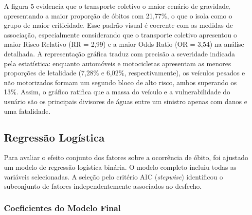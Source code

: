 \documentclass[
  brazilian,
  12pt,
]{article}
\begin{document}
A figura 5 evidencia que o transporte coletivo o maior cenário de
gravidade, apresentando a maior proporção de óbitos com 21,77\%, o que o
isola como o grupo de maior criticidade. Esse padrão visual é coerente
com as medidas de associação, especialmente considerando que o
transporte coletivo apresentou o maior Risco Relativo (RR = 2,99) e a
maior Odds Ratio (OR = 3,54) na análise detalhada. A representação
gráfica traduz com precisão a severidade indicada pela estatística:
enquanto automóveis e motocicletas apresentam as menores proporções de
letalidade (7,28\% e 6,02\%, respectivamente), os veículos pesados e não
motorizados formam um segundo bloco de alto risco, ambos superando os
13\%. Assim, o gráfico ratifica que a massa do veículo e a
vulnerabilidade do usuário são os principais divisores de águas entre um
sinistro apenas com danos e uma fatalidade.

\newpage

\subsection{Regressão Logística}\label{regressuxe3o-loguxedstica}

Para avaliar o efeito conjunto dos fatores sobre a ocorrência de óbito,
foi ajustado um modelo de regressão logística binária. O modelo completo
incluiu todas as variáveis selecionadas. A seleção pelo critério AIC
(\emph{stepwise}) identificou o subconjunto de fatores independentemente
associados ao desfecho.

\subsubsection{Coeficientes do Modelo
Final}\label{coeficientes-do-modelo-final}

\begingroup\fontsize{10}{12}\selectfont
\end{document}
